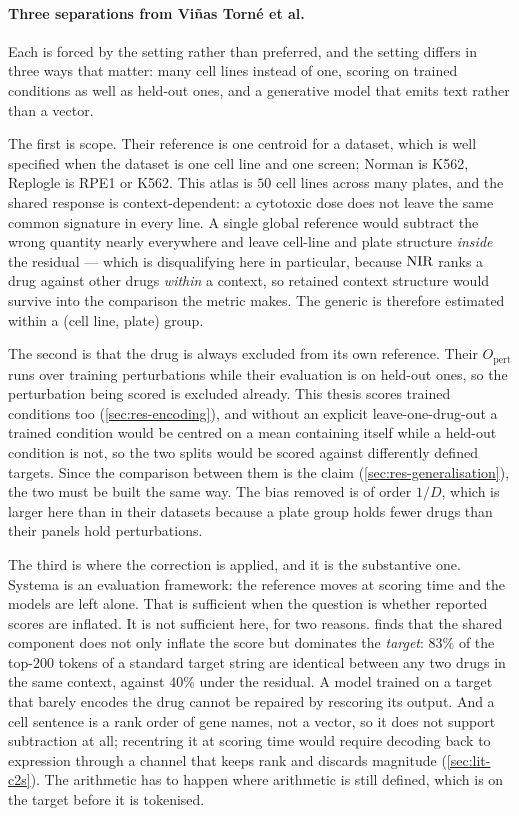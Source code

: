 \paragraph{Three separations from Vi\~nas Torn\'e et al.}
Each is forced by the
setting rather than preferred, and the setting differs in three ways that matter:
many cell lines instead of one, scoring on trained conditions as well as
held-out ones, and a generative model that emits text rather than a vector.

The first is scope. Their reference is one centroid for a dataset, which is
well specified when the dataset is one cell line and one screen; Norman is K562,
Replogle is RPE1 or K562. This atlas is $\num{50}$ cell lines across many plates,
and the shared response is context-dependent: a cytotoxic dose does not leave the
same common signature in every line. A single global reference would subtract the
wrong quantity nearly everywhere and leave cell-line and plate structure
\emph{inside} the residual --- which is disqualifying here in particular, because
$\textrm{NIR}$ ranks a drug against other drugs \emph{within} a context, so retained
context structure would survive into the comparison the metric makes. The generic
is therefore estimated within a (cell line, plate) group.

The second is that the drug is always excluded from its own reference. Their
$O_{\textrm{pert}}$ runs over training perturbations while their evaluation is on
held-out ones, so the perturbation being scored is excluded already. This thesis
scores trained conditions too (\cref{sec:res-encoding}), and without an explicit
leave-one-drug-out a trained condition would be centred on a mean containing
itself while a held-out condition is not, so the two splits would be scored
against differently defined targets. Since the comparison between them is the
claim (\cref{sec:res-generalisation}), the two must be built the same way. The
bias removed is of order $1/D$, which is larger here than in their datasets
because a plate group holds fewer drugs than their panels hold perturbations.

The third is where the correction is applied, and it is the substantive one.
Systema is an evaluation framework: the reference moves at scoring time and the
models are left alone. That is sufficient when the question is whether reported
scores are inflated. It is not sufficient here, for two reasons.
 finds that the shared component does not only inflate
the score but dominates the \emph{target}: $83\%$ of the top-$200$ tokens of a
standard target string are identical between any two drugs in the same context,
against $40\%$ under the residual. A model trained on a target that barely
encodes the drug cannot be repaired by rescoring its output. And a cell sentence
is a rank order of gene names, not a vector, so it does not support subtraction
at all; recentring it at scoring time would require decoding back to expression
through a channel that keeps rank and discards magnitude
(\cref{sec:lit-c2s}). The arithmetic has to happen where arithmetic is
still defined, which is on the target before it is tokenised. 


